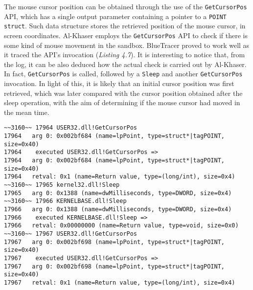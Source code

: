 The mouse cursor position can be obtained through the use of the \texttt{GetCursorPos} API, which has a single output parameter containing a pointer to a \texttt{POINT struct}. Such data structure stores the retrieved position of the mouse cursor, in screen coordinates. Al-Khaser employs the \texttt{GetCursorPos} API to check if there is some kind of mouse movement in the sandbox. BlueTracer proved to work well as it traced the API's invocation (\textit{Listing 4.7}). It is interesting to notice that, from the log, it can be also deduced how the actual check is carried out by Al-Khaser. In fact, \texttt{GetCursorPos} is called, followed by a \texttt{Sleep} and another \texttt{GetCursorPos} invocation. In light of this, it is likely that an initial cursor position was first retrieved, which was later compared with the cursor position obtained after the sleep operation, with the aim of determining if the mouse cursor had moved in the mean time.

\vspace{0.5cm}
\begin{lstlisting}[caption={\texttt{GetCursorPos} evidence in the log },captionpos=b]
~~3160~~ 17964 USER32.dll!GetCursorPos
17964 	arg 0: 0x002bf684 (name=lpPoint, type=struct*|tagPOINT, size=0x40)
17964    executed USER32.dll!GetCursorPos =>
17964 	arg 0: 0x002bf684 (name=lpPoint, type=struct*|tagPOINT, size=0x40)
17964 	retval: 0x1 (name=Return value, type=(long/int), size=0x4)
~~3160~~ 17965 kernel32.dll!Sleep
17965 	arg 0: 0x1388 (name=dwMilliseconds, type=DWORD, size=0x4)
~~3160~~ 17966 KERNELBASE.dll!Sleep
17966 	arg 0: 0x1388 (name=dwMilliseconds, type=DWORD, size=0x4)
17966    executed KERNELBASE.dll!Sleep =>
17966 	retval: 0x00000000 (name=Return value, type=void, size=0x0)
~~3160~~ 17967 USER32.dll!GetCursorPos
17967 	arg 0: 0x002bf698 (name=lpPoint, type=struct*|tagPOINT, size=0x40)
17967    executed USER32.dll!GetCursorPos =>
17967 	arg 0: 0x002bf698 (name=lpPoint, type=struct*|tagPOINT, size=0x40)
17967 	retval: 0x1 (name=Return value, type=(long/int), size=0x4)
\end{lstlisting}

